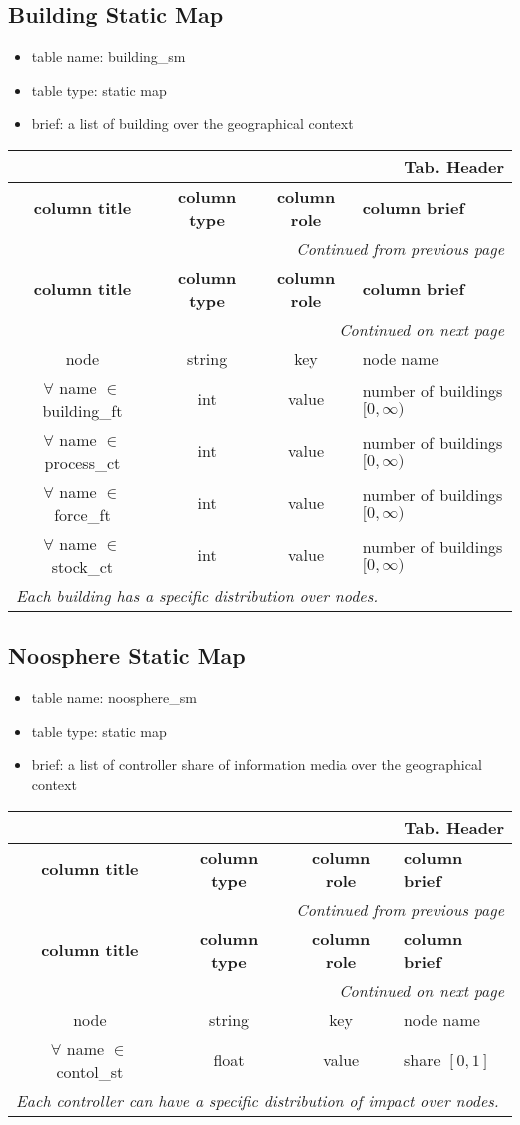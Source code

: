 \documentclass[a4paper,oneside,titlepage]{report}
\newcommand*{\LTHeaderIV}[5]{
  \multicolumn{4}{r}{\textbf{Tab. \thesubsection} \textbf{#1}}\\    
  \hline
  \textbf{#2} & \textbf{#3} & \textbf{#4} & \textbf{#5}\\
  \hline
  
  \endfirsthead
  \multicolumn{4}{r}{\textit{Continued from previous page}}\\    
  \hline
  \textbf{#2} & \textbf{#3} & \textbf{#4} & \textbf{#5}\\
  \hline
  \endhead
  \hline
  \multicolumn{4}{r}{\textit{Continued on next page}}\\
  \endfoot
  \hline
  \endlastfoot  
}
\begin{document}
\subsection{Building Static Map}
\begin{itemize}
  \setlength{\itemsep}{0pt}
  \setlength{\parskip}{0pt}
\item table name: building\_sm  
\item table type: static map  
\item brief: a list of building over the geographical context
\end{itemize}

\begin{longtable}{ |c|c|c|l| } 
  \LTHeaderIV{Header}{column title}{column type}{column role}{column brief}                    
  node & string & key & node name\\
  $\forall$ name $\in$ building\_ft & int & value & number of buildings $[0, \infty)$ \\
  $\forall$ name $\in$ process\_ct & int & value & number of buildings $[0, \infty)$ \\
  $\forall$ name $\in$ force\_ft & int & value & number of buildings $[0, \infty)$ \\
  $\forall$ name $\in$ stock\_ct & int & value & number of buildings $[0, \infty)$ \\
  \multicolumn{4}{|l|}{\textit{Each building has a specific distribution over nodes.}}\\
\end{longtable}        

\subsection{Noosphere Static Map}
\begin{itemize}
  \setlength{\itemsep}{0pt}
  \setlength{\parskip}{0pt}
\item table name: noosphere\_sm  
\item table type: static map  
\item brief: a list of controller share of information media over the geographical context
\end{itemize}

\begin{longtable}{ |c|c|c|l| } 
  \LTHeaderIV{Header}{column title}{column type}{column role}{column brief}                    
  node & string & key & node name\\
  $\forall$ name $\in$ contol\_st & float & value & share $[0, 1]$ \\
  \multicolumn{4}{|l|}{\textit{Each controller can have a specific distribution of impact over nodes.}}\\
\end{longtable}        
\end{document}
